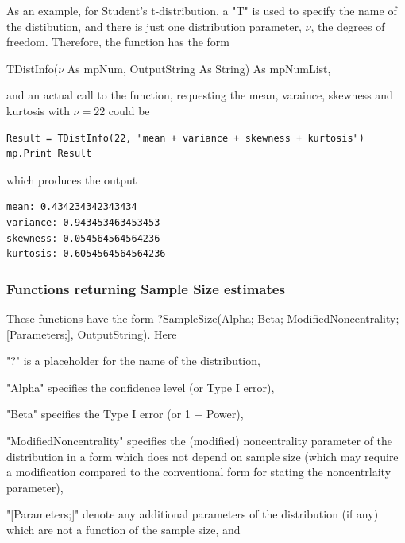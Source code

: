 \vspace{0.3cm}
As an example, for Student's t-distribution, a "T" is used to specify the name of the distibution, and there is just one distribution parameter, $\nu$, the degrees of freedom. Therefore,  the function has the form

\vspace{0.3cm}
\textsf{TDistInfo($\nu$ As mpNum, OutputString As String) As mpNumList}, 

\vspace{0.3cm}
and an actual call to the function, requesting the mean, varaince, skewness and kurtosis with $\nu=22$ could be

\begin{lstlisting}
Result = TDistInfo(22, "mean + variance + skewness + kurtosis")
mp.Print Result
\end{lstlisting}
which produces the output

\begin{verbatim}
mean: 0.434234342343434
variance: 0.943453463453453
skewness: 0.054564564564236
kurtosis: 0.6054564564564236
\end{verbatim}









\newpage
\subsubsection{Functions returning Sample Size estimates}
\label{Functions returning Sample Size estimates}
These functions have the form \textsf{?SampleSize(Alpha; Beta; ModifiedNoncentrality; [Parameters;],  OutputString)}.
Here 

"?" is a placeholder for the name of the distribution, 

"Alpha" specifies the confidence level (or Type I error), 

"Beta" specifies the Type I error (or 1 $-$ Power), 

"ModifiedNoncentrality" specifies the (modified) noncentrality parameter of the distribution in a form which does not depend on sample size (which may require a modification compared to the conventional form for stating the noncentrlaity parameter), 

"[Parameters;]" denote any additional parameters of the distribution (if any) which are not a function of the sample size, and 

